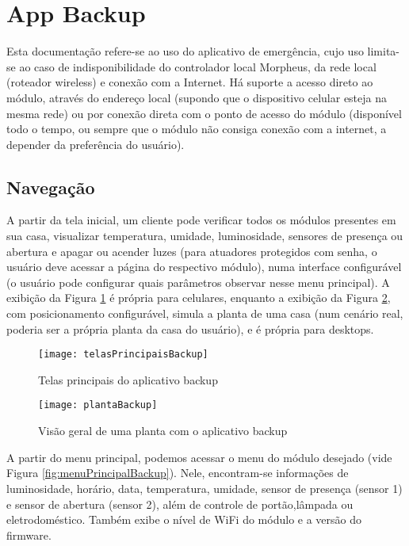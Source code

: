 \section{App Backup}

Esta documentação refere-se ao uso do aplicativo de emergência, cujo uso limita-se ao caso de indisponibilidade do controlador local Morpheus, da rede local (roteador wireless) e conexão com a Internet. Há suporte a acesso direto ao módulo, através do endereço local (supondo que o dispositivo celular esteja na mesma rede) ou por conexão direta com o ponto de acesso do módulo (disponível todo o tempo, ou sempre que o módulo não consiga conexão com a internet, a depender da preferência do usuário).

\subsection{Navegação}

A partir da tela inicial, um cliente pode verificar todos os módulos presentes em sua casa, visualizar temperatura, umidade, luminosidade, sensores de presença ou abertura e apagar ou acender luzes (para atuadores protegidos com senha, o usuário deve acessar a página do respectivo módulo), numa interface configurável (o usuário pode configurar quais parâmetros observar nesse menu principal). A exibição da Figura \ref{fig:telasPrincipaisBackup} é própria para celulares, enquanto a exibição da Figura \ref{fig:plantaBackup}, com posicionamento configurável, simula a planta de uma casa (num cenário real, poderia ser a própria planta da casa do usuário), e é própria para desktops.

\begin{figure}[H]
	\centering
	\caption{Telas principais do aplicativo backup}
  \texttt{[image: telasPrincipaisBackup]}
\label{fig:telasPrincipaisBackup}
\end{figure}

\begin{figure}[H]
  \centering
  \caption{Visão geral de uma planta com o aplicativo backup}
  \texttt{[image: plantaBackup]}
  \label{fig:plantaBackup}
\end{figure}

A partir do menu principal, podemos acessar o menu do módulo desejado (vide Figura \ref{fig:menuPrincipalBackup}). Nele, encontram-se informações de luminosidade, horário, data, temperatura, umidade, sensor de presença (sensor 1) e sensor de abertura (sensor 2), além de controle de portão,lâmpada ou eletrodoméstico. Também exibe o nível de WiFi do módulo e a versão do firmware.

